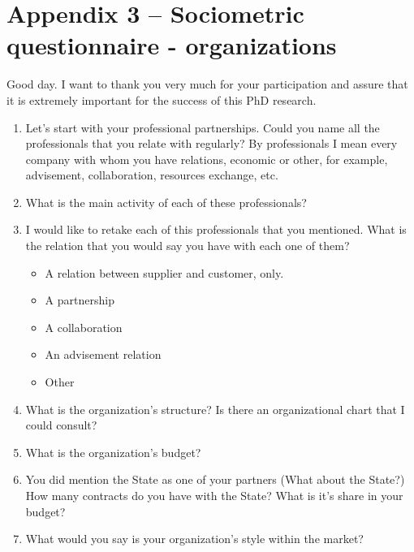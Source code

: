 \documentclass[a4paper, 12pt, openright, oneside, german, french, brazil, english]{abntex2}
\begin{document}
        \newpage

        \section*{Appendix 3 -- Sociometric questionnaire - organizations}

        Good day. I want to thank you very much for your participation and assure that it is extremely important for the success of this PhD research.

        \vspace{1cm}
        \begin{enumerate}
        \item Let's start with your professional partnerships. Could you name all the professionals that you relate with regularly? By professionals I mean every company with whom you have relations, economic or other, for example, advisement, collaboration, resources exchange, etc.

        \item What is the main activity of each of these professionals?

        \item I would like to retake each of this professionals that you mentioned. What is the relation that you would say you have with each one of them?
          \begin{itemize}
          \item A relation between supplier and customer, only.
          \item A partnership
          \item A collaboration
          \item An advisement relation
          \item Other
          \end{itemize}

        \item What is the organization's structure? Is there an organizational chart that I could consult?
        \item What is the organization's budget?     
          
        \item You did mention the State as one of your partners (What about the State?) How many contracts do you have with the State? What is it's share in your budget?
        \item What would you say is your organization's style within the market?


\end{enumerate}
\end{document}
